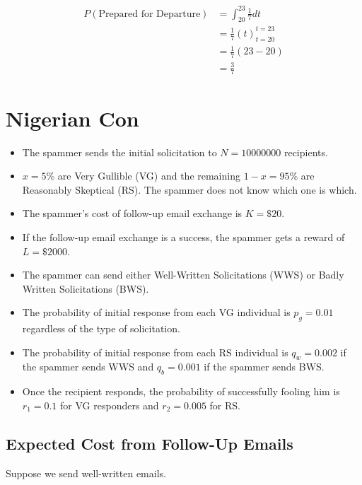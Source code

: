 \documentclass{article}
\begin{document}
\begin{align}
P\left( \text{Prepared for Departure} \right)
	& = \int_{20}^{23} \frac{1}{7} dt \nonumber \\
	& = \frac17 \left( t \right)^{t = 23}_{t = 20} \nonumber \\
	& = \frac17 \left(23 - 20\right) \nonumber \\
	& = \frac37
\end{align}

\section{Nigerian Con}

\begin{itemize}
\item The spammer sends the initial solicitation to $N = 10000000$ recipients.
\item $x = 5\%$ are Very Gullible (VG) and the remaining $1-x = 95\%$ are Reasonably
	Skeptical (RS).
The spammer does not know which one is which.
\item The spammer's cost of follow-up email exchange is $K = \$20$.
\item If the follow-up email exchange is a success, the spammer gets 
	a reward of $L = \$2000$.
\item The spammer can send either Well-Written Solicitations (WWS)
	or Badly Written Solicitations (BWS).
\item The probability of initial response from each VG individual is $p_g = 0.01$
	regardless of the type of solicitation.
\item The probability of initial response from each RS individual is $q_w = 0.002$
	if the spammer sends WWS and $q_b = 0.001$ if the spammer sends BWS.
\item Once the recipient responds, the probability of successfully fooling
	him is $r_1 = 0.1$ for VG responders and $r_2 = 0.005$ for RS.
\end{itemize}

\subsection{Expected Cost from Follow-Up Emails}

Suppose we send well-written emails.
\end{document}
